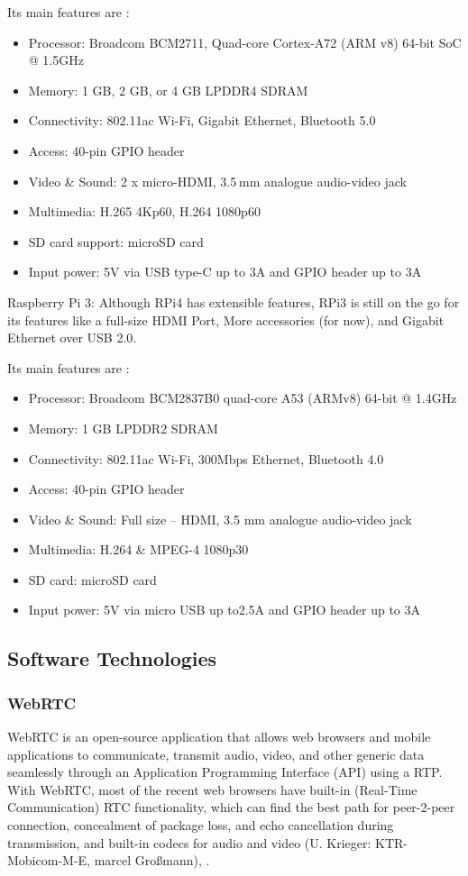 Its main features are \cite{pi4vs3}: 
\begin{itemize}
	\item Processor: Broadcom BCM2711, Quad-core Cortex-A72 (ARM v8) 64-bit SoC @ 1.5GHz
	\item Memory: 1 GB, 2 GB, or 4 GB LPDDR4 SDRAM
	\item Connectivity: 802.11ac Wi-Fi, Gigabit Ethernet, Bluetooth 5.0
	\item Access: 40-pin GPIO header
	\item Video \& Sound: 2 x micro-HDMI, 3.5 mm analogue audio-video jack
	\item Multimedia: H.265 4Kp60, H.264 1080p60
	\item SD card support: microSD card
	\item Input power: 5V via USB type-C up to 3A and GPIO header up to 3A
\end{itemize}

Raspberry Pi 3:
Although RPi4 has extensible features, RPi3 is still on the go for its features like a full-size HDMI Port, More accessories (for now), and Gigabit Ethernet over USB 2.0. \par

Its main features are \cite{pi4vs3}:
\begin{itemize}
	\item Processor: Broadcom BCM2837B0 quad-core A53 (ARMv8) 64-bit @ 1.4GHz
	\item Memory: 1 GB LPDDR2 SDRAM
	\item Connectivity: 802.11ac Wi-Fi, 300Mbps Ethernet, Bluetooth 4.0
	\item Access: 40-pin GPIO header
	\item Video \& Sound: Full size – HDMI, 3.5 mm analogue audio-video jack
	\item Multimedia: H.264 \& MPEG-4 1080p30
	\item SD card: microSD card
	\item Input power: 5V via micro USB up to2.5A and GPIO header up to 3A
\end{itemize} 

\subsection{Software Technologies}

\subsubsection{WebRTC}
WebRTC is an open-source application that allows web browsers and mobile applications to communicate, transmit audio, video, and other generic data seamlessly through an Application Programming Interface (API) using a RTP. With WebRTC, most of the recent web browsers have built-in (Real-Time Communication) RTC functionality, which can find the best path for peer-2-peer connection, concealment of package loss, and echo cancellation during transmission, and built-in codecs for audio and video (U. Krieger: KTR-Mobicom-M-E, marcel Großmann), \cite{webrtc}. \par

